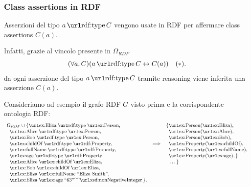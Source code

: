 \documentclass[8pt]{beamer}
\begin{document}
\begin{frame}
 \frametitle{Class assertions in RDF}
 Asserzioni del tipo $a\, \mathurl{rdf:type}\,C$ vengono usate in RDF 
 per affermare class assertions $C(a)$.
 \vspace{\baselineskip}
 
 Infatti, grazie al vincolo presente in $\Omega_{RDF}$
 \[
  (\forall a, C)(a\,\mathurl{rdf:type}\,C \leftrightarrow C(a)) \quad(*).
 \]
 da ogni asserzione del tipo $a\, \mathurl{rdf:type}\,C$ tramite reasoning
 viene inferita una asserzione $C(a)$.
 \vspace{\baselineskip}
 
 Consideriamo ad esempio il grafo RDF $G$ visto prima e la corrispondente 
 ontologia RDF:
 \[
 \begin{small}
 \begin{array}{lcl}
  \Omega_{RDF} \cup \{ \tripleO{ex:Eliza}{rdf:type}{ex:Person},&&\{ \mathurl{ex:Person}(\mathurl{ex:Eliza}),\\
  \phantom{\{} \tripleO{ex:Alice}{rdf:type}{ex:Person},&&\phantom{\{}\mathurl{ex:Person}(\mathurl{ex:Alice}),\\
  \phantom{\{} \tripleO{ex:Bob}{rdf:type}{ex:Person},&&\phantom{\{}\mathurl{ex:Person}(\mathurl{ex:Bob}),\\
  \phantom{\{} \tripleO{ex:childOf}{rdf:type}{rdf:Property},& \Longrightarrow & \phantom{\{}\mathurl{ex:Property}(\mathurl{ex:childOf}),\\
  \phantom{\{} \tripleO{ex:fullName}{rdf:type}{rdf:Property},&&\phantom{\{}\mathurl{ex:Property}(\mathurl{ex:fullName}),\\
  \phantom{\{} \tripleO{ex:age}{rdf:type}{rdf:Property},&&\phantom{\{}\mathurl{ex:Property}(\mathurl{ex:age}),\}\\
  \phantom{\{} \tripleO{ex:Alice}{ex:childOf}{ex:Eliza},&&\phantom{\{}\ldots \, \}\\
  \phantom{\{} \tripleO{ex:Bob}{ex:childOf}{ex:Eliza},\\
  \phantom{\{} \triple{ex:Eliza}{ex:fullName}{\stringLiteral{Eliza Smith}},\\
  \phantom{\{} \triple{ex:Eliza}{ex:age}{\literal{63}{xsd:nonNegativeInteger}} \,\},\\
\end{array}
\end{small}
\]
\end{frame}
\end{document}
